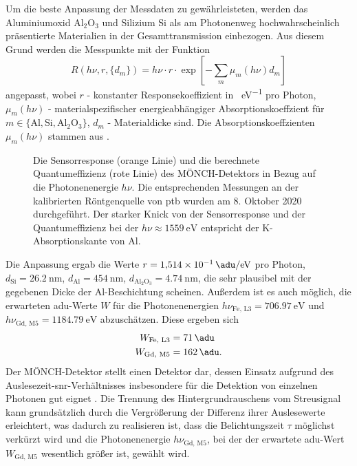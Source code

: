\noindent
Um die beste Anpassung der Messdaten zu gewährleisteten, werden das Aluminiumoxid Al$_2$O$_3$ und Silizium Si als am Photonenweg hochwahrscheinlich präsentierte Materialien in der Gesamttransmission einbezogen. Aus diesem Grund werden die Messpunkte mit der Funktion
\begin{equation}
    R(h\nu, r, \{d_m\}) = h\nu\cdot r\cdot\exp\left[-\sum_{m}\mu_m(h\nu)d_m\right]
\end{equation}
angepasst, wobei $r$ - konstanter Responsekoeffizient in \si{\adu\per\eV} pro Photon, $\mu_m(h\nu)$ - materialspezifischer energieabhängiger Absorptionskoeffzient für $m \in \{\text{Al}, \text{Si}, \text{Al$_2$O$_3$}\}$,  $d_m$ - Materialdicke sind. Die Absorptionskoeffzienten $\mu_m(h\nu)$ stammen aus \cite{xray-coeffs}.
\begin{figure}[H]
    \centering
    
    \caption{Die Sensorresponse (orange Linie) und die berechnete Quantumeffizienz (rote Linie) des MÖNCH-Detektors in Bezug auf die Photonenenergie $h\nu$. Die entsprechenden Messungen an der kalibrierten Röntgenquelle von \gls{ptb} wurden am 8. Oktober 2020 durchgeführt. Der starker Knick von der Sensorresponse und der Quantumeffizienz bei der $h\nu \approx \SI{1559}{\eV}$ entspricht der K-Absorptionskante von Al.}
    \label{fig:response_moench}
\end{figure}


\noindent
Die Anpassung ergab die Werte
$r = \SI{1.514e-1}{\adu\per\eV}$ pro Photon, $d_\text{Si} = \SI{26.2}{\nano\meter}$, $d_\text{Al} = \SI{454}{\nano\meter}$,
$d_\text{Al$_2$O$_3$} = \SI{4.74}{\nano\meter}$, die sehr plausibel mit der gegebenen Dicke der Al-Beschichtung scheinen. Außerdem ist es auch möglich, die erwarteten \gls{adu}-Werte $W$ für die Photonenenergien $h\nu_{\text{Fe, L3}} = \SI{706.97}{\eV}$ und $h\nu_{\text{Gd, M5}} = \SI{1184.79}{\eV}$ abzuschätzen. Diese ergeben sich 
\begin{equation}
\begin{split}
     W_{\text{Fe, L3}} &= \SI{71}{\adu}\\
     W_{\text{Gd, M5}} &= \SI{162}{\adu}.
\end{split}
\label{eq:auselesewerte_fe_gd}
\end{equation}
\noindent
Der MÖNCH-Detektor stellt einen Detektor dar, dessen Einsatz aufgrund des Auslesezeit-\gls{snr}-Verhältnisses insbesondere für die Detektion von einzelnen Photonen gut eignet \cite{bergamaschi_monch_2018}. Die Trennung des Hintergrundrauschens vom Streusignal kann grundsätzlich durch die Vergrößerung der Differenz ihrer Auslesewerte erleichtert, was dadurch zu realisieren ist, dass die Belichtungszeit $\tau$ möglichst verkürzt wird und die Photonenenergie $h\nu_{\text{Gd, M5}}$, bei der der erwartete \gls{adu}-Wert $W_{\text{Gd, M5}}$ wesentlich größer ist, gewählt wird.

